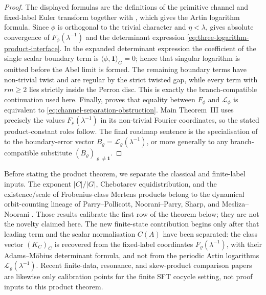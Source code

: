 \documentclass[11pt,a4paper]{amsart}
\theoremstyle{plain}
\theoremstyle{definition}
\theoremstyle{remark}
\begin{document}
\begin{proof}
  The displayed formulas are the definitions of the primitive channel and
  fixed-label Euler transform together with
  , which gives the Artin
  logarithm formula.  Since \(\phi\) is orthogonal to the trivial character
  and \(\eta<\lambda\),  gives
  absolute convergence of \(F_\phi(\lambda^{-1})\) and the determinant
  expression \eqref{eq:three-logarithm-product-interface}.  In the expanded
  determinant expression the coefficient of the single scalar boundary term is
  \(\langle\phi,\mathbf1\rangle_G=0\); hence that singular logarithm is omitted
  before the Abel limit is formed.  The remaining boundary terms have
  non-trivial twist and are regular by the strict twisted gap, while every
  term with \(rm\ge2\) lies strictly inside the Perron disc.  This is exactly
  the branch-compatible continuation used here.
  Finally,  proves that equality
  between \(F_\phi\) and \(\mathcal L_\phi\) is equivalent to
  \eqref{eq:channel-separation-obstruction}.  Main Theorem~III uses
  precisely the values \(F_\varrho(\lambda^{-1})\) in its non-trivial
  Fourier coordinates, so the stated product-constant roles follow.  The
  final roadmap sentence is the specialisation of
   to the boundary-error
  vector
  \(B_\varrho=\mathcal L_\varrho(\lambda^{-1})\), or more generally to any
  branch-compatible substitute \((B_\varrho)_{\varrho\ne\mathbf1}\).
\end{proof}

Before stating the product theorem, we separate the classical and finite-label
inputs.  The exponent \(|C|/|G|\), Chebotarev equidistribution, and the
existence/scale of Frobenius-class Mertens products belong to the dynamical
orbit-counting lineage of Parry--Pollicott, Noorani--Parry, Sharp, and
Mesliza--Noorani
\cite{ParryPollicott1986Chebotarev,NooraniParry1992ChebotarevShifts,Sharp1991Mertens,MeslizaNoorani1999FrobeniusMertens}.
Those results calibrate the first row of the theorem below; they are not the
novelty claimed here.  The new finite-state contribution begins only after
that leading term and the scalar normalisation \(C(A)\) have been separated:
the class vector \((K_C)_C\) is recovered from the fixed-label coordinates
\(F_\varrho(\lambda^{-1})\), with their Adams--M\"obius determinant formula,
and not from the periodic Artin logarithms
\(\mathcal L_\varrho(\lambda^{-1})\).  Recent finite-data, resonance, and
skew-product comparison papers are likewise only calibration points for the
finite SFT cocycle setting, not proof inputs to this product theorem.
\end{document}
